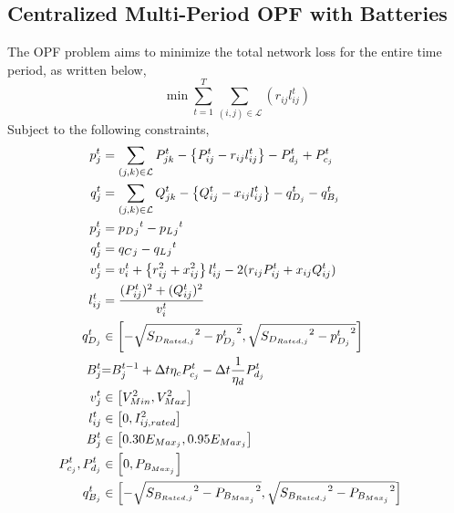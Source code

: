 \documentclass{article}
\begin{document}
\subsection{Centralized Multi-Period OPF with Batteries}
The OPF problem aims to minimize the total network loss for the entire time period, as written below,
\begin{equation}
    \min {\sum_{t = 1}^{T} \sum_{(i, j) \in \mathcal{L}} (r_{ij}l_{ij}^t)}
\end{equation}
Subject to the following constraints,
\begin{align}
    {p_j^t} & = {\sum_{(j, k) \in \mathcal{L}} P_{jk}^t - \left\{P_{ij}^t - r_{ij}l_{ij}^t\right\} - P_{d_j}^t + P_{c_j}^t} && \label{eq:Pij} \\ 
    {q_j^t} & = {\sum_{(j, k) \in \mathcal{L}} Q_{jk}^t - \left\{Q_{ij}^t - x_{ij}l_{ij}^t\right\} - q_{D_j}^t - q_{B_j}^t} && \label{eq:Qij} \\ 
    {p_j^t} &= {p_D{_j}^t - p_L{_j}^t} \label{eq:pj}\\
    {q_j^t} &= {q_C{_j} -q_L{_j}^t} \label{eq:qj}\\
    {v_j^t} & = {v_{i}^t +  \left\{r_{ij}^2 + x_{ij}^2\right\}l_{ij}^t - 2(r_{ij}P_{ij}^t + x_{ij}Q_{ij}^t)} \label{eq:vj} && \\
    {l_{ij}^t} & = {\frac{(P_{ij}^{t})^2 + (Q_{ij}^{t})^2}{v_i^t}} \label{eq:lij} && \\
    { q^{t}_{D_{j}} } 
    &\in
    { \left[-\sqrt{ {S_{D_{Rated, j}}}^2 - {p^{t}_{D_{j}}}^2}, \sqrt{ {S_{D_{Rated, j}}}^2 - {p^{t}_{D_{j}}}^2}\right] } \label{eq:qDj} && \\
    {\color{darkgreen}{ B_{j}^{t} }} &\color{darkgreen}{=} { \color{darkgreen}{ B_{j}^{t-1} + \Delta t  \eta_c P_{c_j}^t - \Delta t\frac{1}{\eta_d} P_{d_j}^t } } && \\
    { v^{t}_{j} } &\in { \left[ V^{2}_{Min}, V^{2}_{Max} \right]} \label{eq:lim_vj} && \\
    { l^{t}_{ij} } &\in { \left[ 0, I^{2}_{ij, rated}
    \right] } \label{eq:lim_lij} && \\
    { B^{t}_{j} } &\in { \left[ 0.30E_{Max_{j}}, 0.95E_{Max_{j}} \right] } \label{eq:lim_Bj} && \\
    { P^{t}_{c_{j}}, P^{t}_{d_{j}} }
    &\in
    { \left[ 0, P_{B_{Max_{j}}} \right]} \label{eq:lim_PcPdj} && \\
    { q^{t}_{B_{j}} } 
    &\in 
    { \left[-\sqrt{ {S_{B_{Rated, j}}}^2 - {P_{B_{Max_{j}}}}^2}, \sqrt{ {S_{B_{Rated, j}}}^2 - {P_{B_{Max_{j}}}}^2}\right] } \label{eq:qBj} &&
\end{align}
\end{document}
